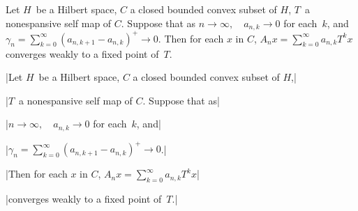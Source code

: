 

\bigskip

\medskip

Let $H$~be a Hilbert space, $C$ a closed bounded convex subset of $H$,
$T$~a nonespansive self map of $C$. Suppose that as 
$n \to \infty, \quad a_{n,k} \to 0$ for each~$k$, and 
$\gamma_n = \sum_{k = 0}^{\infty}\left(a_{n,k+1} - a_{n,k}\right)^+ \to 0$.
Then for each $x$ in $C$, $A_nx = \sum_{k = 0}^{\infty}a_{n,k} T^kx$ 
converges weakly to a fixed point of~$T$.

\bigskip

\respuestaS

|Let $H$~be a Hilbert space, $C$ a closed bounded convex subset of $H$,|

|$T$~a nonespansive self map of $C$. Suppose that as|

|$n \to \infty, \quad a_{n,k} \to 0$ for each~$k$, and|

|$\gamma_n = \sum_{k = 0}^{\infty}\left(a_{n,k+1} - a_{n,k}\right)^+ \to 0$.|

|Then for each $x$ in $C$, $A_nx = \sum_{k = 0}^{\infty}a_{n,k} T^kx$|

|converges weakly to a fixed point of~$T$.|

\bye

